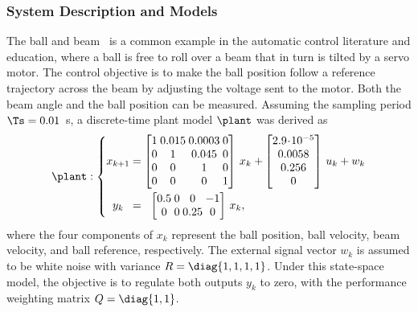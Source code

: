 \subsubsection*{System Description and Models}
The ball and beam~\cite{Wellstead:1978} is a common example in the automatic control literature and education, where a ball is free to roll over a beam that in turn is tilted by a servo motor.
The control objective is to make the ball position follow a reference trajectory across the beam by adjusting the voltage sent to the motor. Both the beam angle and the ball position can be measured.
Assuming the sampling period $\Ts = 0.01$~s, a discrete-time plant model $\plant$ was derived as
%
\begin{equation*}
\setlength\arraycolsep{1.25pt}
    \label{eq:bnb-plant}
    \plant : 
    \left\{
    \begin{matrix}
        x_{k+1} &=& 
        \begin{bmatrix}
            1 & 0.015 & 0.0003 & 0\\
            0 & 1 & 0.045 & 0\\
            0 & 0 & 1 & 0 \\
            0 & 0 & 0 & 1
        \end{bmatrix}\,x_k &+ 
        \begin{bmatrix}
            2.9\!\cdot\!10^{-5} \\
            0.0058 \\
            0.256 \\
            0
        \end{bmatrix}\,u_k + w_k \\ \vspace{-3mm} \\
        y_k &=& 
        \begin{bmatrix}
            0.5 & 0 & 0 & -1\\
            0 & 0 & 0.25 & 0
        \end{bmatrix}\,x_k, & 
    \end{matrix}
    \right.
\end{equation*}
where the four components of $x_k$ represent the ball position, ball velocity, beam velocity, and ball reference, respectively. The external signal vector $w_k$ is assumed to be white noise with variance $R = \diag{1,1,1,1}$. Under this state-space model, the objective is to regulate both outputs $y_k$ to zero, with the performance weighting matrix $Q = \diag{1,1}$.

